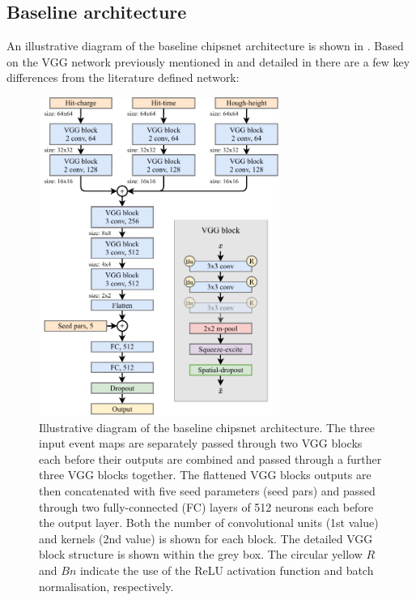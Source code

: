 \subsection{Baseline architecture} %
\label{sec:cnn_baseline_arch} %

An illustrative diagram of the baseline chipsnet architecture is shown in
. Based on the VGG network previously mentioned in
 and detailed in  there are a few key
differences from the literature defined network:

\begin{figure} %
    \includegraphics[width=0.7\textwidth]{diagrams/6-cnn/chipsnet.pdf}
    \caption[Illustrative diagram of the baseline chipsnet architecture]
    {Illustrative diagram of the baseline chipsnet architecture. The three input event maps are
        separately passed through two VGG blocks each before their outputs are combined and passed
        through a further three VGG blocks together. The flattened VGG blocks outputs are then
        concatenated with five seed parameters (seed pars) and passed through two fully-connected
        (FC) layers of 512 neurons each before the output layer. Both the number of convolutional
        units (1st value) and kernels (2nd value) is shown for each block. The detailed VGG block
        structure is shown within the grey box. The circular yellow $R$ and $Bn$ indicate the use
        of the ReLU activation function and batch normalisation, respectively.}
    \label{fig:chipsnet}
\end{figure}

